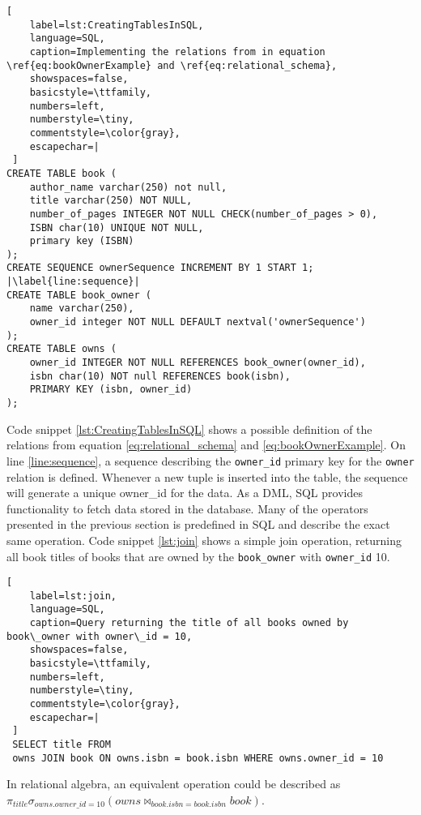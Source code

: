 \begin{lstlisting}[
    label=lst:CreatingTablesInSQL,
    language=SQL,
    caption=Implementing the relations from in equation \ref{eq:bookOwnerExample} and \ref{eq:relational_schema},
    showspaces=false,
    basicstyle=\ttfamily,
    numbers=left,
    numberstyle=\tiny,
    commentstyle=\color{gray},
    escapechar=|
 ]
CREATE TABLE book (
    author_name varchar(250) not null,
    title varchar(250) NOT NULL,
    number_of_pages INTEGER NOT NULL CHECK(number_of_pages > 0),
    ISBN char(10) UNIQUE NOT NULL,
    primary key (ISBN)
);
CREATE SEQUENCE ownerSequence INCREMENT BY 1 START 1; |\label{line:sequence}|
CREATE TABLE book_owner (
    name varchar(250),
    owner_id integer NOT NULL DEFAULT nextval('ownerSequence')
);
CREATE TABLE owns (
    owner_id INTEGER NOT NULL REFERENCES book_owner(owner_id),
    isbn char(10) NOT null REFERENCES book(isbn),
    PRIMARY KEY (isbn, owner_id)
);
\end{lstlisting}

Code snippet \ref{lst:CreatingTablesInSQL} shows a possible definition of the relations from equation \ref{eq:relational_schema} and \ref{eq:bookOwnerExample}.
On line \ref{line:sequence}, a sequence describing the \texttt{owner\_id} primary key for the \texttt{owner} relation is defined.
Whenever a new tuple is inserted into the table, the sequence will generate a unique owner\_id for the data.
As a DML, SQL provides functionality to fetch data stored in the database. 
Many of the operators presented in the previous section is predefined in SQL and describe the exact same operation. 
Code snippet \ref{lst:join} shows a simple join operation, returning all book titles of books that are owned by the \texttt{book\_owner} with \texttt{owner\_id} 10.

\begin{lstlisting}[
    label=lst:join,
    language=SQL,
    caption=Query returning the title of all books owned by book\_owner with owner\_id = 10,
    showspaces=false,
    basicstyle=\ttfamily,
    numbers=left,
    numberstyle=\tiny,
    commentstyle=\color{gray},
    escapechar=|
 ]
 SELECT title FROM
 owns JOIN book ON owns.isbn = book.isbn WHERE owns.owner_id = 10  
\end{lstlisting}

In relational algebra, an equivalent operation could be described as \\$\pi_{title}\sigma_{owns.owner\_id = 10}(owns \Join_{book.isbn = book.isbn} book )$.

